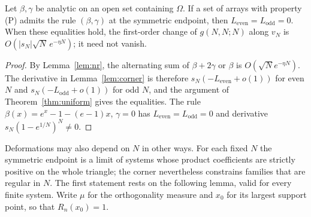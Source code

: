 \begin{corollary}\label{cor:analytic-rules}
Let $\beta,\gamma$ be analytic on an open set containing $\Omega$. If a set of arrays with property (P) admits the rule $(\beta,\gamma)$ at the symmetric endpoint, then $L_{\mathrm{even}}=L_{\mathrm{odd}}=0$. When these equalities hold, the first-order change of $g(N,N;N)$ along $v_N$ is $O(|s_N|\sqrt N\,e^{-\eta N})$; it need not vanish.
\end{corollary}
\begin{proof}
By Lemma~\ref{lem:nr}, the alternating sum of $\beta+2\gamma$ or $\beta$ is $O(\sqrt Ne^{-\eta N})$. The derivative in Lemma~\ref{lem:corner} is therefore $s_N(-L_{\mathrm{even}}+o(1))$ for even $N$ and $s_N(-L_{\mathrm{odd}}+o(1))$ for odd $N$, and the argument of Theorem~\ref{thm:uniform} gives the equalities. The rule $\beta(x)=e^x-1-(e-1)x$, $\gamma=0$ has $L_{\mathrm{even}}=L_{\mathrm{odd}}=0$ and derivative $s_N(1-e^{1/N})^N\neq0$.
\end{proof}

Deformations may also depend on $N$ in other ways. For each fixed $N$ the symmetric endpoint is a limit of systems whose product coefficients are strictly positive on the whole triangle; the corner nevertheless constrains families that are regular in $N$. The first statement rests on the following lemma, valid for every finite system. Write $\mu$ for the orthogonality measure and $x_0$ for its largest support point, so that $R_n(x_0)=1$.

